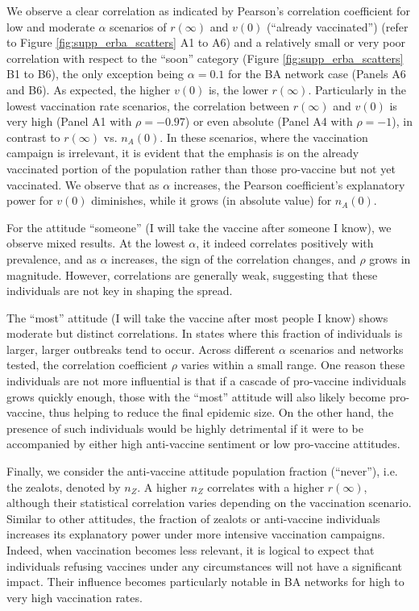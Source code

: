 \documentclass[
 reprint,
 amsmath,amssymb,
 aps,
]{revtex4-2}
\begin{document}
We observe a clear correlation as indicated by Pearson's correlation coefficient for low and moderate $\alpha$ scenarios of $r(\infty)$ and $v(0)$ (``already vaccinated'') (refer to Figure \ref{fig:supp_erba_scatters} A1 to A6) and a relatively small or very poor correlation with respect to the ``soon'' category (Figure \ref{fig:supp_erba_scatters} B1 to B6), the only exception being $\alpha=0.1$ for the BA network case (Panels A6 and B6). As expected, the higher $v(0)$ is, the lower $r(\infty)$. Particularly in the lowest vaccination rate scenarios, the correlation between $r(\infty)$ and $v(0)$ is very high (Panel A1 with $\rho=-0.97$) or even absolute (Panel A4 with $\rho=-1$), in contrast to $r(\infty)$ vs. $n_A(0)$. In these scenarios, where the vaccination campaign is irrelevant, it is evident that the emphasis is on the already vaccinated portion of the population rather than those pro-vaccine but not yet vaccinated. We observe that as $\alpha$ increases, the Pearson coefficient's explanatory power for $v(0)$ diminishes, while it grows (in absolute value) for $n_A(0)$.

For the attitude ``someone'' (I will take the vaccine after someone I know), we observe mixed results. At the lowest $\alpha$, it indeed correlates positively with prevalence, and as $\alpha$ increases, the sign of the correlation changes, and $\rho$ grows in magnitude. However, correlations are generally weak, suggesting that these individuals are not key in shaping the spread. 

The ``most'' attitude (I will take the vaccine after most people I know) shows moderate but distinct correlations. In states where this fraction of individuals is larger, larger outbreaks tend to occur. Across different $\alpha$ scenarios and networks tested, the correlation coefficient $\rho$ varies within a small range. One reason these individuals are not more influential is that if a cascade of pro-vaccine individuals grows quickly enough, those with the ``most'' attitude will also likely become pro-vaccine, thus helping to reduce the final epidemic size. On the other hand, the presence of such individuals would be highly detrimental if it were to be accompanied by either high anti-vaccine sentiment or low pro-vaccine attitudes.

Finally, we consider the anti-vaccine attitude population fraction (``never''), i.e. the zealots, denoted by $n_Z$. A higher $n_Z$ correlates with a higher $r(\infty)$, although their statistical correlation varies depending on the vaccination scenario. Similar to other attitudes, the fraction of zealots or anti-vaccine individuals increases its explanatory power under more intensive vaccination campaigns. Indeed, when vaccination becomes less relevant, it is logical to expect that individuals refusing vaccines under any circumstances will not have a significant impact. Their influence becomes particularly notable in BA networks for high to very high vaccination rates.
\end{document}
